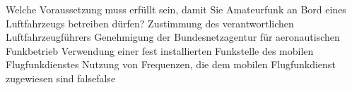     {Welche Voraussetzung muss erfüllt sein, damit Sie Amateurfunk an Bord eines Luftfahrzeugs betreiben dürfen?}
    {Zustimmung des verantwortlichen Luftfahrzeugführers}
    {Genehmigung der Bundesnetzagentur für aeronautischen Funkbetrieb}
    {Verwendung einer fest installierten Funkstelle des mobilen Flugfunkdienstes}
    {Nutzung von Frequenzen, die dem mobilen Flugfunkdienst zugewiesen sind}
    {false}{false}